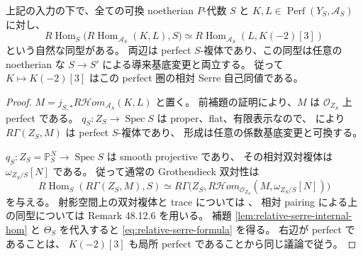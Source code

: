 \begin{theorem}[四係数族全体の相対Serre公式]
\label{thm:relative-serre-projective}
上記の入力の下で、全ての可換 noetherian $P$-代数 $S$ と
$K,L\in\operatorname{Perf}(Y_S,\mathscr A_S)$ に対し、
\begin{equation}\label{eq:relative-serre-formula}
 R\operatorname{Hom}_S
 \bigl(R\operatorname{Hom}_{\mathscr A_S}(K,L),S\bigr)
 \simeq
 R\operatorname{Hom}_{\mathscr A_S}(L,K(-2)[3])
\end{equation}
という自然な同型がある。
両辺は perfect $S$-複体であり、この同型は任意の noetherian な
$S\to S'$ による導来基底変更と両立する。
従って $K\mapsto K(-2)[3]$ はこの perfect 圏の相対 Serre 自己同値である。
\end{theorem}

\begin{proof}
$M=j_{S,*}R\mathcal Hom_{\mathscr A_S}(K,L)$ と置く。
前補題の証明により、$M$ は $\mathcal O_{Z_S}$ 上 perfect である。
$q_S:Z_S\to\operatorname{Spec}S$ は proper、flat、有限表示なので、
\cite[Lemma~36.30.4(1), Tag~\texttt{0B91}]{StacksRelativeDuality}により
$R\Gamma(Z_S,M)$ は perfect $S$-複体であり、
形成は任意の係数基底変更と可換する。

$q_S:Z_S=\mathbb P^N_S\to\operatorname{Spec}S$ は smooth projective であり、
その相対双対複体は $\omega_{Z_S/S}[N]$ である。
従って通常の Grothendieck 双対性は
\[
 R\operatorname{Hom}_S(R\Gamma(Z_S,M),S)
 \simeq
 R\Gamma\bigl(Z_S,
 R\mathcal Hom_{\mathcal O_{Z_S}}(M,\omega_{Z_S/S}[N])\bigr)
\]
を与える。
射影空間上の双対複体と trace については
\cite[Lemma~48.15.1, Tag~\texttt{0A9W}]{StacksRelativeDuality}、
相対 pairing による上の同型については Remark 48.12.6 を用いる。
補題 \ref{lem:relative-serre-internal-hom} と
$\Theta_S$ を代入すると \eqref{eq:relative-serre-formula} を得る。
右辺が perfect であることは、
$K(-2)[3]$ も局所 perfect であることから同じ議論で従う。


\end{proof}
